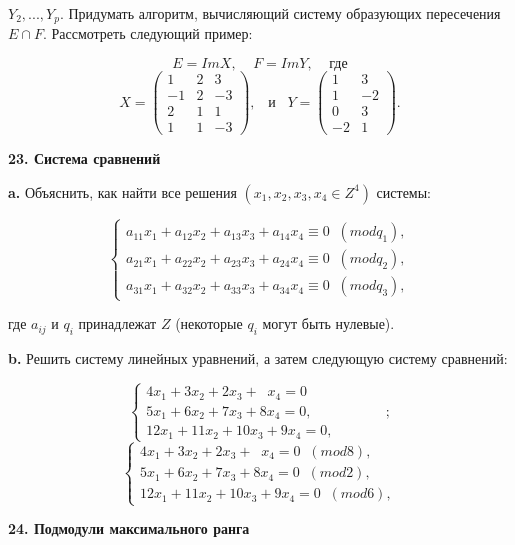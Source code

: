 \documentclass{../template/mai_book}
\begin{document}
\pagebreak

\noindent$ Y_2,...,Y_p. $ Придумать алгоритм, вычисляющий систему образующих 
пересечения $E\cap F$. Рассмотреть следующий пример: 


$$ E=ImX,\;\;\;\;F=ImY,\;\;\;\;\text{где} $$ 
$$X=\begin{pmatrix}
1 & 2 & 3  \\
-1 & 2 & -3 \\
2 & 1 & 1 \\
1 & 1 & -3 
\end{pmatrix},\;\;\;\text{и}\;\;\;
Y=\begin{pmatrix}
1 & 3 \\
1 & -2  \\
0 & 3 \\
-2 & 1  
\end{pmatrix}.$$ 

{\noindent\bf23. Система сравнений} 

\medskip

{\bf a.} Объяснить, как найти все решения $ (x_1,x_2,x_3,x_4 \in Z^4) $ системы: 


$$ \begin{cases}
 a_{11}x_1 +a_{12}x_2 + a_{13}x_3 + a_{14}x_4\equiv 0\;\; (mod q_1),\\
 a_{21}x_1 +a_{22}x_2 + a_{23}x_3 + a_{24}x_4\equiv 0\;\; (mod q_2),\\
 a_{31}x_1 +a_{32}x_2 + a_{33}x_3 + a_{34}x_4\equiv 0\;\; (mod q_3),
 \end{cases}$$ 

\noindent где $a_{ij}$ и $q_i$ принадлежат $Z$ (некоторые $q_i$ могут быть нулевые). 

\medskip

{\bf b.} Решить систему линейных уравнений, а затем следующую 
систему сравнений: 


 $$\begin{cases}
 4x_1 + 3x_2 + 2x_3 + \;\;x_4=0\\
 5x_1 + 6x_2 + 7x_3 + 8x_4=0,\\
 12x_1 + 11x_2 + 10x_3 + 9x_4=0,
 \end{cases}\;\;\;\;\;\;\;\;\;\;\;\;;$$
 $$ \begin{cases}
4x_1 + 3x_2 + 2x_3 + \;\;x_4=0\;\; (mod 8),\\
 5x_1 + 6x_2 + 7x_3 + 8x_4=0\;\; (mod 2),\\
 12x_1 + 11x_2 + 10x_3 + 9x_4=0\;\; (mod 6),
 \end{cases}$$ 


{\noindent\bf24. Подмодули максимального ранга} 
\end{document}
